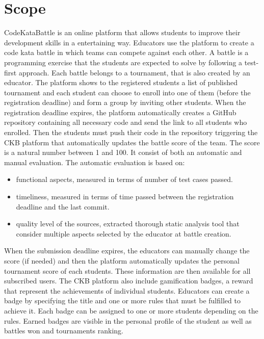 \section{Scope}
CodeKataBattle is an online platform that allows students to improve their development skills in a entertaining way. \newline
Educators use the platform to create a code kata battle in which teams can compete against each other. A battle is a programming exercise that the students are expected to solve by following a test-first approach. Each battle belongs to a tournament, that is also created by an educator.
The platform shows to the registered students a list of published tournament and each student can choose to enroll into one of them (before the registration deadline) and form a group by inviting other students. \newline
When the registration deadline expires, the platform automatically creates a GitHub repository containing all necessary code and send the link to all students who enrolled. 
Then the students must push their code in the repository triggering the CKB platform that automatically updates the battle score of the team. \newline
The score is a natural number between 1 and 100. It consist of both an automatic and manual evaluation.  
The automatic evaluation is based on:
\begin{itemize}
    \item functional aspects, measured in terms of number of test cases passed.
    \item timeliness, measured in terms of time passed between the registration deadline and the last commit.
    \item quality level of the sources, extracted thorough static analysis tool that consider multiple aspects selected by the educator at battle creation.
\end{itemize}
When the submission deadline expires, the educators can manually change the score (if needed) and then the platform automatically updates the personal tournament score of each students. These information are then available for all subscribed users. \newline
The CKB platform also include gamification badges, a reward that represent the achievements of individual students. Educators can create a badge by specifying the title and one or more rules that must be fulfilled to achieve it. Each badge can be assigned to one or more students depending on the rules. Earned badges are visible in the personal profile of the student as well as battles won and tournaments ranking.

